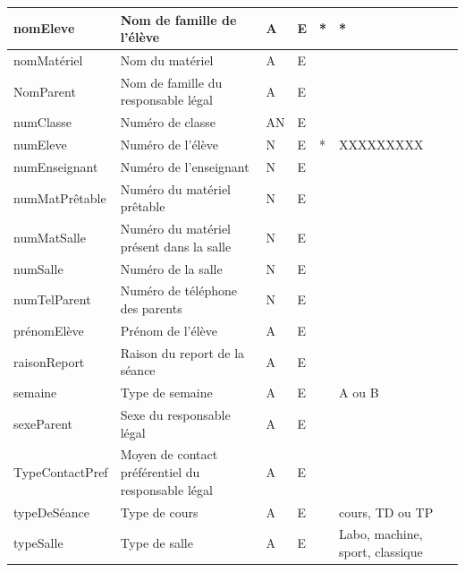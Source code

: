 \documentclass[12pt,french,titlepage]{article}
\begin{document}
	  \begin{tabular}{p{4cm}|p{3cm}|p{1cm}|p{1cm}|p{1cm}|p{2cm}}
	       nomEleve &	Nom de famille de l'élève &	A &	E &	* &	* \\ \hline
nomMatériel	& Nom du matériel &	A &	E & &		\\ \hline
NomParent &	Nom de famille du responsable légal &	A &	E	& &	\\ \hline
numClasse &	Numéro de classe &	AN &	E	& &	\\ \hline
numEleve &	Numéro de l'élève &	N &	E &	* &	XXXXXXXXX\\ \hline
numEnseignant &	Numéro de l'enseignant &	N &	E & &		\\ \hline
numMatPrêtable &	Numéro du matériel prêtable &	N &	E & &	\\ \hline	
numMatSalle &	Numéro du matériel présent dans la salle &	N &	E & &	\\ \hline	
numSalle &	Numéro de la salle &	N &	E & &		\\ \hline
numTelParent &	Numéro de téléphone des parents &	N &	E & &	\\ \hline	
prénomElève &	Prénom de l'élève &	A &	E & &		\\ \hline
raisonReport &	Raison du report de la séance &	A &	E & &	\\ \hline	
semaine &	Type de semaine &	A &	E & & A ou B		\\ \hline
sexeParent &	Sexe du responsable légal &	A &	E & &	\\ \hline	
TypeContactPref &	Moyen de contact préférentiel du responsable légal &	A &	E &	\\ \hline	
typeDeSéance &	Type de cours &	A &	E & & cours, TD ou TP		\\ \hline
typeSalle &	Type de salle &	A &	E & & Labo, machine, sport, classique		\\ 
	  \end{tabular}
	  



	    
	  





	
	
	
\end{document}
